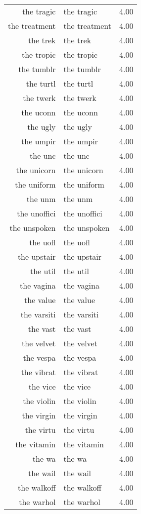 \begin{table}[ht]
\begin{tabular}{rlr}
  the tragic & the tragic & 4.00 \\ 
  the treatment & the treatment & 4.00 \\ 
  the trek & the trek & 4.00 \\ 
  the tropic & the tropic & 4.00 \\ 
  the tumblr & the tumblr & 4.00 \\ 
  the turtl & the turtl & 4.00 \\ 
  the twerk & the twerk & 4.00 \\ 
  the uconn & the uconn & 4.00 \\ 
  the ugly & the ugly & 4.00 \\ 
  the umpir & the umpir & 4.00 \\ 
  the unc & the unc & 4.00 \\ 
  the unicorn & the unicorn & 4.00 \\ 
  the uniform & the uniform & 4.00 \\ 
  the unm & the unm & 4.00 \\ 
  the unoffici & the unoffici & 4.00 \\ 
  the unspoken & the unspoken & 4.00 \\ 
  the uofl & the uofl & 4.00 \\ 
  the upstair & the upstair & 4.00 \\ 
  the util & the util & 4.00 \\ 
  the vagina & the vagina & 4.00 \\ 
  the value & the value & 4.00 \\ 
  the varsiti & the varsiti & 4.00 \\ 
  the vast & the vast & 4.00 \\ 
  the velvet & the velvet & 4.00 \\ 
  the vespa & the vespa & 4.00 \\ 
  the vibrat & the vibrat & 4.00 \\ 
  the vice & the vice & 4.00 \\ 
  the violin & the violin & 4.00 \\ 
  the virgin & the virgin & 4.00 \\ 
  the virtu & the virtu & 4.00 \\ 
  the vitamin & the vitamin & 4.00 \\ 
  the wa & the wa & 4.00 \\ 
  the wail & the wail & 4.00 \\ 
  the walkoff & the walkoff & 4.00 \\ 
  the warhol & the warhol & 4.00 \\ 

\end{tabular}
\end{table}
